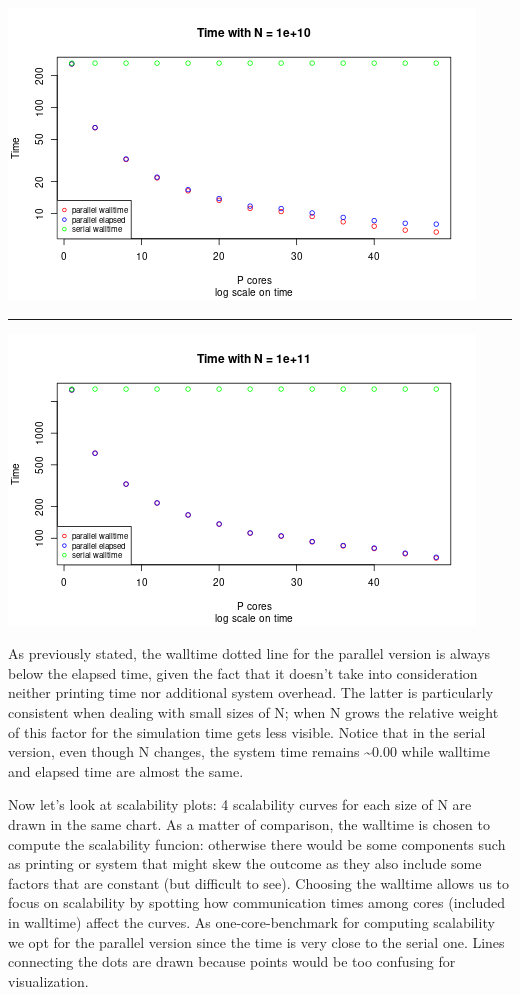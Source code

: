 \documentclass[
  10pt,
]{article}
\begin{document}
\begin{center}\includegraphics{figs/ss_time-3} \end{center}

\begin{center}\rule{0.5\linewidth}{0.5pt}\end{center}

\begin{center}\includegraphics{figs/ss_time-4} \end{center}

As previously stated, the walltime dotted line for the parallel version
is always below the elapsed time, given the fact that it doesn't take
into consideration neither printing time nor additional system overhead.
The latter is particularly consistent when dealing with small sizes of
N; when N grows the relative weight of this factor for the simulation
time gets less visible. Notice that in the serial version, even though N
changes, the system time remains \textasciitilde0.00 while walltime and
elapsed time are almost the same.

Now let's look at scalability plots: 4 scalability curves for each size
of N are drawn in the same chart. As a matter of comparison, the
walltime is chosen to compute the scalability funcion: otherwise there
would be some components such as printing or system that might skew the
outcome as they also include some factors that are constant (but
difficult to see). Choosing the walltime allows us to focus on
scalability by spotting how communication times among cores (included in
walltime) affect the curves. As one-core-benchmark for computing
scalability we opt for the parallel version since the time is very close
to the serial one. Lines connecting the dots are drawn because points
would be too confusing for visualization.
\end{document}
